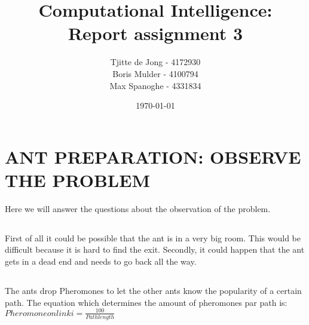 \documentclass{scrartcl}
\begin{document}
\title{Computational Intelligence:
\\Report assignment 3}
\date{\today{}}

\author{
    \begin{tabular}{l r}
    	\\Tjitte de Jong - 4172930
	\\Boris Mulder - 4100794
        \\Max Spanoghe - 4331834
            \end{tabular}
  }
  
\maketitle \thispagestyle{empty} \pagebreak
  
\section{ANT PREPARATION: OBSERVE THE PROBLEM}
  Here we will answer the questions about the observation of the problem.
  
\subsection{}
First of all it could be possible that the ant is in a very big room. This would be difficult because it is hard to find the exit.
Secondly, it could happen that the ant gets in a dead end and needs to go back all the way.

\subsection{}
The ants drop Pheromones to let the other ants know the popularity of a certain path. The equation which determines the amount of pheromones par path is: \\
$Pheromone on link i = \frac{100}{Path length}$
  
 
  
\end{document}
